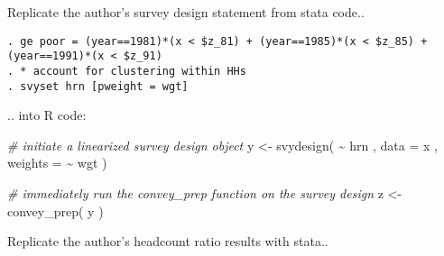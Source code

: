\documentclass[
]{book}
\newenvironment{Shaded}{\begin{snugshade}}{\end{snugshade}}
\newcommand{\AttributeTok}[1]{\textcolor[rgb]{0.77,0.63,0.00}{#1}}
\newcommand{\CommentTok}[1]{\textcolor[rgb]{0.56,0.35,0.01}{\textit{#1}}}
\newcommand{\DecValTok}[1]{\textcolor[rgb]{0.00,0.00,0.81}{#1}}
\newcommand{\FloatTok}[1]{\textcolor[rgb]{0.00,0.00,0.81}{#1}}
\newcommand{\FunctionTok}[1]{\textcolor[rgb]{0.00,0.00,0.00}{#1}}
\newcommand{\NormalTok}[1]{#1}
\newcommand{\OtherTok}[1]{\textcolor[rgb]{0.56,0.35,0.01}{#1}}
\newcommand{\SpecialCharTok}[1]{\textcolor[rgb]{0.00,0.00,0.00}{#1}}
\begin{document}
\begin{Shaded}
\end{Shaded}

Replicate the author's survey design statement from stata code..

\begin{verbatim}
. ge poor = (year==1981)*(x < $z_81) + (year==1985)*(x < $z_85) +  (year==1991)*(x < $z_91)
. * account for clustering within HHs 
. svyset hrn [pweight = wgt]
\end{verbatim}

.. into R code:

\begin{Shaded}
\begin{Highlighting}[]
\CommentTok{\# initiate a linearized survey design object}
\NormalTok{y }\OtherTok{\textless{}{-}} \FunctionTok{svydesign}\NormalTok{( }\SpecialCharTok{\textasciitilde{}}\NormalTok{ hrn , }\AttributeTok{data =}\NormalTok{ x , }\AttributeTok{weights =} \SpecialCharTok{\textasciitilde{}}\NormalTok{ wgt )}

\CommentTok{\# immediately run the \textasciigrave{}convey\_prep\textasciigrave{} function on the survey design}
\NormalTok{z }\OtherTok{\textless{}{-}} \FunctionTok{convey\_prep}\NormalTok{( y )}
\end{Highlighting}
\end{Shaded}

Replicate the author's headcount ratio results with stata..
\end{document}
